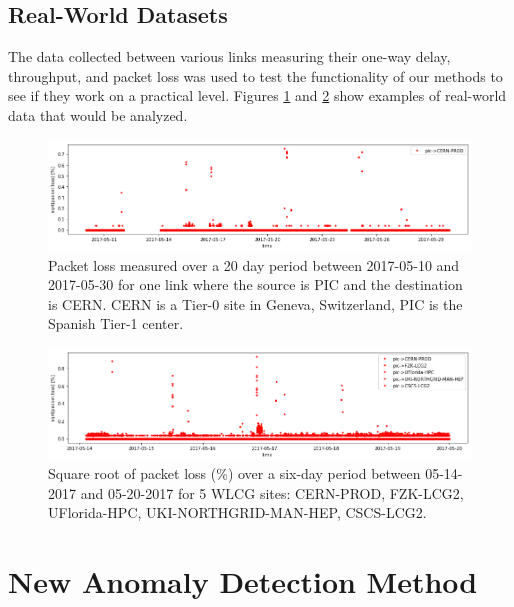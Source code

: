 \documentclass[5p]{elsarticle}
\begin{document}
\fi


\subsection{Real-World Datasets}

The data collected between various links measuring their one-way delay, throughput, and packet loss was used to test the functionality of our methods to see if they work on a practical level. Figures \ref{fig:real_one} and \ref{fig:real_five} show examples of real-world data that would be analyzed.

\begin{figure}[htbp]
    \centering
    \includegraphics[width=\linewidth]{real_data_one_link.png}
    \caption{Packet loss measured over a 20 day period between 2017-05-10 and 2017-05-30 for one link where the source is PIC and the destination is CERN. CERN is a Tier-0 site in Geneva, Switzerland, PIC is the Spanish Tier-1 center.}
    \label{fig:real_one}
\end{figure}

\begin{figure}[htbp]
    \centering
    \includegraphics[width=\linewidth]{real_data_5_links.png}
    \caption{Square root of packet loss (\%)  over a six-day period between 05-14-2017 and 05-20-2017 for 5 WLCG sites: CERN-PROD, FZK-LCG2, UFlorida-HPC, UKI-NORTHGRID-MAN-HEP, CSCS-LCG2.}
    \label{fig:real_five}
\end{figure}

\section{New Anomaly Detection Method}
\end{document}
